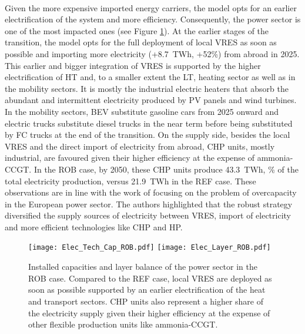\\

Given the more expensive imported energy carriers, the model opts for an earlier electrification of the system and more efficiency. Consequently, the power sector is one of the most impacted ones (see Figure \ref{fig:rob_pol_ROB_elec}). At the earlier stages of the transition,  the model opts for the full deployment of local \gls{VRES} as soon as possible and importing more electricity (\ie +8.7~TWh, +52\%) from abroad in 2025.  This earlier and bigger integration of \gls{VRES} is supported by the higher electrification of \gls{HT} and, to a smaller extent the \gls{LT}, heating sector as well as in the mobility sectors. It is mostly the industrial electric heaters that absorb the abundant and intermittent electricity produced by \gls{PV} panels and wind turbines. In the mobility sectors, \gls{BEV} substitute gasoline cars from 2025 onward and electric trucks substitute diesel trucks in the near term before being substituted by \gls{FC} trucks at the end of the transition.  On the supply side, besides the local \gls{VRES} and the direct import of electricity from abroad, \gls{CHP} units, mostly industrial, are favoured given their higher efficiency at the expense of ammonia-\gls{CCGT}. In the ROB case, by 2050, these \gls{CHP} units produce 43.3~TWh, \% of the total electricity production, versus 21.9~TWh in the REF case. These observations are in line with the work of  \citet{moret2020overcapacity} focusing on the problem of overcapacity in the European power sector. The authors highlighted that the robust strategy diversified the supply sources of electricity between \gls{VRES}, import of electricity and more efficient technologies like \gls{CHP} and \gls{HP}.

\begin{figure}[htbp!]
\centering
\texttt{[image: Elec\_Tech\_Cap\_ROB.pdf]}
\texttt{[image: Elec\_Layer\_ROB.pdf]}
\caption{Installed capacities and layer balance of the power sector in the ROB case. Compared to the REF case, local \gls{VRES} are deployed as soon as possible supported by an earlier electrification of the heat and transport sectors. \gls{CHP} units also represent a higher share of the electricity supply given their higher efficiency at the expense of other flexible production units like ammonia-\gls{CCGT}.}
\label{fig:rob_pol_ROB_elec}
\end{figure}

\\

